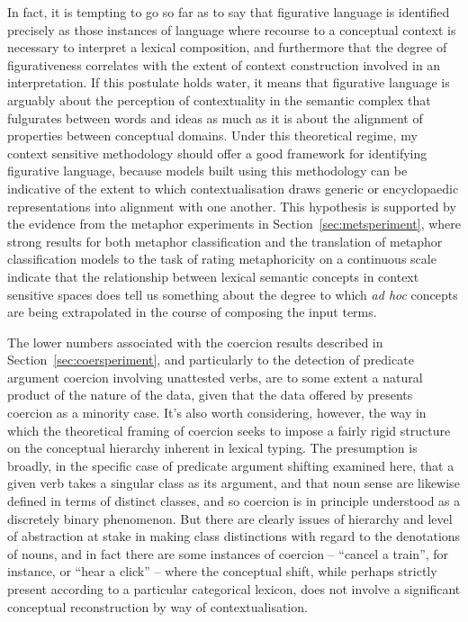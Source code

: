 In fact, it is tempting to go so far as to say that figurative language is identified precisely as those instances of language where recourse to a conceptual context is necessary to interpret a lexical composition, and furthermore that the degree of figurativeness correlates with the extent of context construction involved in an interpretation.  If this postulate holds water, it means that figurative language is arguably about the perception of contextuality in the semantic complex that fulgurates between words and ideas as much as it is about the alignment of properties between conceptual domains.  Under this theoretical regime, my context sensitive methodology should offer a good framework for identifying figurative language, because models built using this methodology can be indicative of the extent to which contextualisation draws generic or encyclopaedic representations into alignment with one another.  This hypothesis is supported by the evidence from the metaphor experiments in Section~\ref{sec:metsperiment}, where strong results for both metaphor classification and the translation of metaphor classification models to the task of rating metaphoricity on a continuous scale indicate that the relationship between lexical semantic concepts in context sensitive spaces does tell us something about the degree to which \emph{ad hoc} concepts are being extrapolated in the course of composing the input terms.

The lower numbers associated with the coercion results described in Section~\ref{sec:coersperiment}, and particularly to the detection of predicate argument coercion involving unattested verbs, are to some extent a natural product of the nature of the data, given that the data offered by \cite{PustejovskyEA2010} presents coercion as a minority case.  It's also worth considering, however, the way in which the theoretical framing of coercion seeks to impose a fairly rigid structure on the conceptual hierarchy inherent in lexical typing.  The presumption is broadly, in the specific case of predicate argument shifting examined here, that a given verb takes a singular class as its argument, and that noun sense are likewise defined in terms of distinct classes, and so coercion is in principle understood as a discretely binary phenomenon.  But there are clearly issues of hierarchy and level of abstraction at stake in making class distinctions with regard to the denotations of nouns, and in fact there are some instances of coercion -- ``cancel a train'', for instance, or ``hear a click'' -- where the conceptual shift, while perhaps strictly present according to a particular categorical lexicon, does not involve a significant conceptual reconstruction by way of contextualisation.

